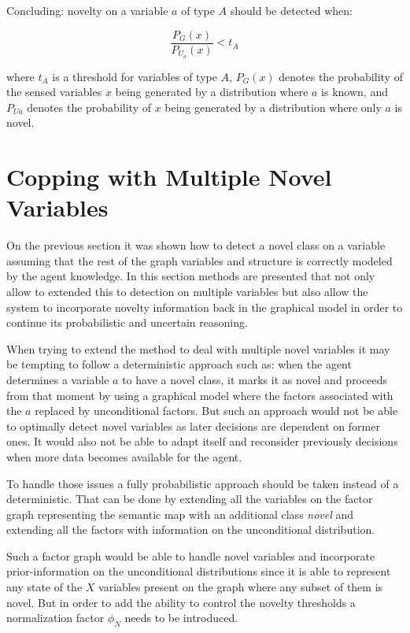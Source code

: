 Concluding: novelty on a variable $a$ of type $A$ should be detected when:

\begin{equation}
\frac{P_G(x)}{P_{U_a}(x)} < t_A
\end{equation}

where $t_A$ is a threshold for variables of type $A$, $P_G(x)$ denotes the
probability of the sensed variables $x$ being generated by a distribution
where $a$ is known, and $P_{Ua}$ denotes the probability of $x$ being generated
by a distribution where only $a$ is novel.

\section{Copping with Multiple Novel Variables}
On the previous section it was shown how to detect a novel class on a variable
assuming that the rest of the graph variables and structure is correctly modeled
by the agent knowledge.
In this section methods are presented that not only allow to extended this to
detection on multiple variables but also allow the system to incorporate
novelty information back in the graphical model in order to continue its
probabilistic and uncertain reasoning.

When trying to extend the method to deal with multiple novel variables it may
be tempting to follow a deterministic approach such as:
when the agent determines a variable $a$ to have a novel class, it marks it as
novel and proceeds from that moment by using a graphical model where the factors
associated with the $a$ replaced by unconditional factors.
But such an approach would not be able to optimally detect novel variables
as later decisions are dependent on former ones.
It would also not be able to adapt itself and reconsider previously decisions
when more data becomes available for the agent.

To handle those issues a fully probabilistic approach should be taken
instead of a deterministic.
That can be done by extending all the variables on the factor graph representing
the semantic map with an additional class \emph{novel} and extending all the
factors with information on the unconditional distribution.

Such a factor graph would be able to handle novel variables and incorporate
prior-information on the unconditional distributions since it is able to
represent any state of the $X$ variables present on the graph where any
subset of them is novel. But in order to add the ability to control the
novelty thresholds a normalization factor $\phi_N$ needs to be introduced.

